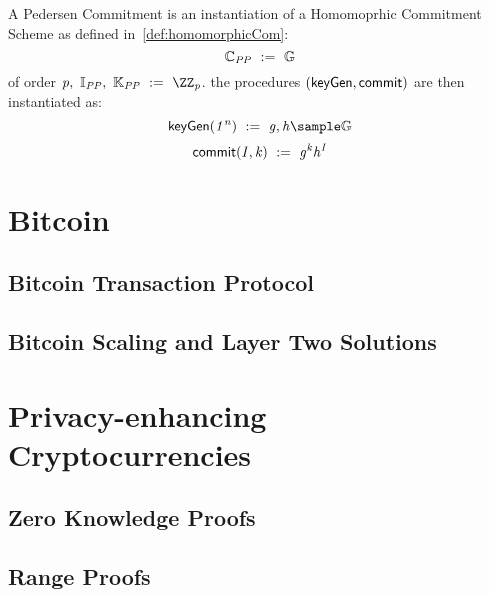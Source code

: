\begin{definition}\label{def:pedersenCom}
    A Pedersen Commitment is an instantiation of a Homomoprhic Commitment Scheme as defined in~\ref{def:homomorphicCom}:
    \[ \mathbb{C}_{\mathit{PP}} ~:=~ \mathbb{G}\] of order $\varPrime \opSeperate \varInputSpace_{\varPublicParam} \opSeperate \varRandSpace_{\varPublicParam} \opAssign \cnstIntegersPrime{\varPrime}$.
    the procedures $(\mathsf{keyGen}, \mathsf{commit})$ are then instantiated as:
    \[ \procSetup{\varSecParam} \opAssign \varG, \varH \sample \cnstGroup\]
    \[ \mathsf{commit}(\mathit{I}, \mathit{k}) ~:=~ \mathit{g}^{\mathit{k}} \mathit{h}^{\mathit{I}} \]

\end{definition}


\section{Bitcoin}\label{sec:bitcoin}

\subsection{Bitcoin Transaction Protocol}\label{sec:bitcoinTx}

\subsection{Bitcoin Scaling and Layer Two Solutions}\label{sec:bitcoinScaling}


\section{Privacy-enhancing Cryptocurrencies}\label{sec:privacyCryptos}

\subsection{Zero Knowledge Proofs}\label{sec:zeroKnowlegde}

\subsection{Range Proofs}\label{sec:rangeProof}

